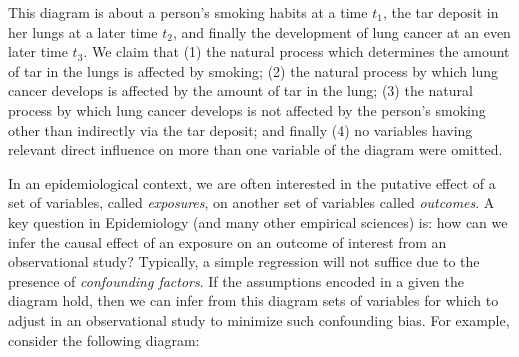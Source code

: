\documentclass[a4paper,10pt]{article}
\begin{document}
\begin{center}
\end{center}

This diagram is about a person's smoking habits at a time $t_1$,
the tar deposit in her lungs at a later time $t_2$, and finally the
development of lung cancer at an even later time $t_3$. We claim that 
(1) the natural process which determines the amount of tar in the
lungs is affected by smoking; 
(2) the natural process by which lung cancer develops is affected by
the amount of tar in the lung; (3) the natural 
process by which lung cancer develops is not affected by the person's
smoking other than indirectly via the tar deposit; 
and finally (4) no variables having
relevant direct influence on more than one variable
of the diagram were omitted.

In an epidemiological context, we are often interested in the putative 
effect of a set of variables, called \emph{exposures}, on another set of variables
called \emph{outcomes}. A key question in Epidemiology (and many other empirical sciences)
is: how can we infer the causal effect of an exposure on an outcome of interest from
an observational study? Typically, a simple regression will not suffice due to the 
presence of \emph{confounding factors}. 
If the assumptions encoded in a given the diagram hold,
then we can infer from this diagram sets of variables 
for which to adjust in an observational study to 
minimize such confounding bias. For example,
consider the following diagram: 

\begin{center}
\end{center}
\end{document}
